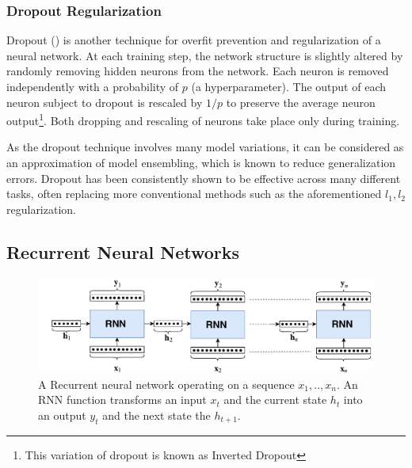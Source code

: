 \subsubsection{Dropout Regularization}

Dropout (\cite{dropout}) is another technique for overfit prevention and regularization of a neural network. At each training step, the network structure is slightly altered by randomly removing hidden neurons from the network. Each neuron is removed independently with a probability of $p$ (a hyperparameter). The output of each neuron subject to dropout is rescaled by $1/p$ to preserve the average neuron output\footnote{This variation of dropout is known as Inverted Dropout}. Both dropping and rescaling of neurons take place only during training. 

As the dropout technique involves many model variations, it can be considered as an approximation of model ensembling, which is known to reduce generalization errors. Dropout has been consistently shown to be effective across many different tasks, often replacing more conventional methods such as the aforementioned $l_1,l_2$ regularization.

 

\subsection{Recurrent Neural Networks} \label{sec:recurrent}

\begin{figure}
    \centering
    \includegraphics[width=1\textwidth]{Figures/rnn.pdf}
    \caption{A Recurrent neural network operating on a sequence $x_1,..,x_n$. An RNN function transforms an input $x_t$ and the current state $h_t$ into an output $y_t$ and the next state the $h_{t+1}$.}
    \label{fig:rnn}
\end{figure}

